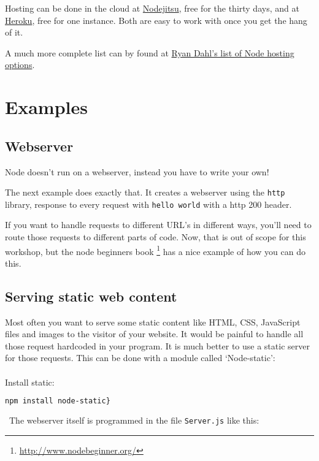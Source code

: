 \documentclass[a4paper]{report}
\begin{document}
Hosting can be done in the cloud at \href{https://www.nodejitsu.com/}{Nodejitsu}, free for the thirty days, and at \href{https://www.heroku.com/}{Heroku}, free for one instance. Both are easy to work with once you get the hang of it.

A much more complete list can by found at \href{https://github.com/joyent/node/wiki/Node-Hosting}{Ryan Dahl's list of Node hosting options}.

\section*{Examples}

\subsection*{Webserver}
Node doesn't run on a webserver, instead you have to write your own! 

The next example does exactly that. It creates a webserver using the \texttt{http} library, response to every request with \texttt{hello world} with a http 200 header.



\noindent If you want to handle requests to different URL's in different ways, you'll need to route those requests to different parts of code. Now, that is out of scope for this workshop, but the node beginners book \footnote{\url{http://www.nodebeginner.org/}} has a nice example of how you can do this.

\subsection*{Serving static web content}
Most often you want to serve some static content like HTML, CSS, JavaScript files and images to the visitor of your website. It would be painful to handle all those request hardcoded in your program. It is much better to use a static server for those requests. This can be done with a module called `Node-static':\\
\\
\noindent Install static:
\begin{lstlisting}[language=bash]
npm install node-static}
\end{lstlisting}
\noindent\ The webserver itself is programmed in the file \texttt{Server.js} like this:

\end{document}
